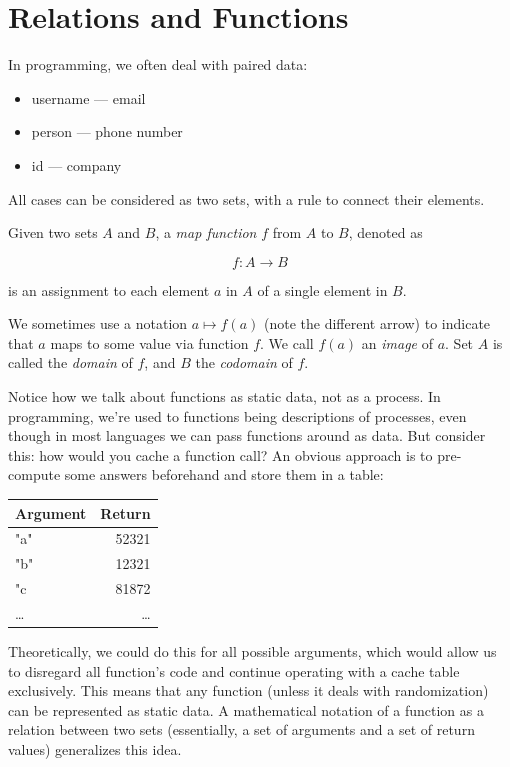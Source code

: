\documentclass[a4paper, justified, notitlepage, sfsidenotes, notoc]{tufte-book}
\begin{document}
\section{Relations and Functions}
\label{sec:org603c575}

In programming, we often deal with paired data:

\begin{itemize}
\item username — email
\item person — phone number
\item id — company
\end{itemize}

All cases can be considered as two sets, with a rule to connect their elements.

Given two sets \(A\) and \(B\), a \emph{map function} \(f\) from \(A\) to \(B\), denoted as

\begin{equation}
f: A \rightarrow B
\end{equation}

is an assignment  to each element \(a\) in \(A\) of a single element in \(B\).

We sometimes use a notation \(a \mapsto f(a)\) (note the different arrow) to indicate that \(a\) maps to some value via function \(f\). We call \(f(a)\) an \emph{image} of \(a\). Set \(A\) is called the \emph{domain} of \(f\), and \(B\) the \emph{codomain} of \(f\).

Notice how we talk about functions as static data, not as a process. In programming, we're used to functions being descriptions of processes, even though in most languages we can pass functions around as data. But consider this: how would you cache a function call? An obvious approach is to pre-compute some answers beforehand and store them in a table:

\begin{center}
\begin{tabular}{lr}
Argument & Return\\
\hline
"a" & 52321\\
"b" & 12321\\
"c & 81872\\
\ldots{} & \ldots{}\\
\end{tabular}
\end{center}

Theoretically, we could do this for all possible arguments, which would allow us to disregard all function's code and continue operating with a cache table exclusively. This means that any function (unless it deals with randomization) can be represented as static data. A mathematical notation of a function as a relation between two sets (essentially, a set of arguments and a set of return values) generalizes this idea.
\end{document}
